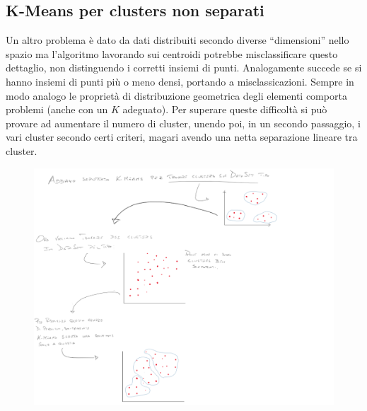 \subsection{K-Means per clusters non separati}
Un altro problema è dato da dati distribuiti secondo diverse ``dimensioni''
nello spazio ma l'algoritmo lavorando sui centroidi potrebbe misclassificare
questo dettaglio, non distinguendo i corretti insiemi di punti. Analogamente
succede se si hanno insiemi di punti più o meno densi, portando a
misclassicazioni. Sempre in modo analogo le proprietà di distribuzione
geometrica degli elementi comporta problemi (anche con un $K$ adeguato).
Per superare queste difficoltà si può provare ad aumentare il numero di cluster,
unendo poi, in un secondo passaggio, i vari cluster secondo certi criteri,
magari avendo una netta separazione lineare tra cluster.
 \begin{figure}[H]
    \centering
    \includegraphics[width=1\textwidth]{img/kmeans5.PNG}
\end{figure}
